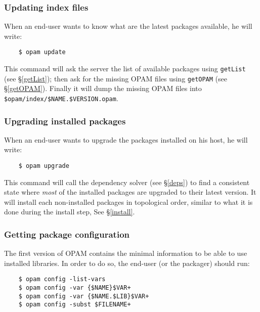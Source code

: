 \documentclass[a4paper,11pt]{article}
\begin{document}
\subsubsection{Updating index files}

When an end-user wants to know what are the latest packages available,
he will write:

\begin{verbatim}
    $ opam update
\end{verbatim}

This command will ask the server the list of available packages using
{\tt getList} (see \S\ref{getList}); then ask for the missing OPAM
files using {\tt getOPAM} (see \S\ref{getOPAM}). Finally it will dump
the missing OPAM files into \verb+$opam/index/$NAME.$VERSION.opam+.

\subsubsection{Upgrading installed packages}

When an end-user wants to upgrade the packages installed on his host,
he will write:

\begin{verbatim}
    $ opam upgrade
\end{verbatim}

This command will call the dependency solver (see \S\ref{deps}) to
find a consistent state where {\em most} of the installed packages are
upgraded to their latest version. It will install each non-installed
packages in topological order, similar to what it is done during the
install step, See \S\ref{install}.

\subsubsection{Getting package configuration}
\label{opam-config}

The first version of OPAM contains the minimal information to be able
to use installed libraries. In order to do so, the end-user (or the
packager) should run:

\begin{verbatim}
    $ opam config -list-vars
    $ opam config -var {$NAME}$VAR+
    $ opam config -var {$NAME.$LIB}$VAR+
    $ opam config -subst $FILENAME+
\end{verbatim}

\end{document}
